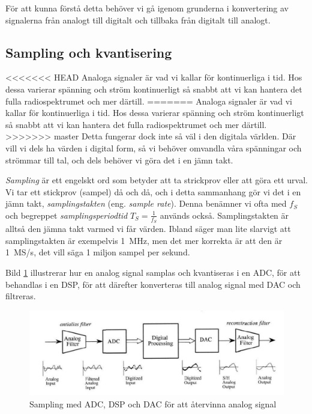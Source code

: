 För att kunna förstå detta behöver vi gå igenom grunderna i konvertering av
signalerna från analogt till digitalt och tillbaka från digitalt till analogt.

\subsection{Sampling och kvantisering}

<<<<<<< HEAD
Analoga signaler är vad vi kallar för kontinuerliga i tid. Hos dessa varierar 
spänning och ström kontinuerligt så snabbt att vi kan hantera det fulla 
radiospektrumet och mer därtill.
=======
Analoga signaler är vad vi kallar för kontinuerliga i tid. Hos dessa varierar spänning och
ström kontinuerligt så snabbt att vi kan hantera det fulla radiospektrumet och mer därtill.
>>>>>>> master
Detta fungerar dock inte så väl i den digitala världen.
Där vill vi dels ha värden i digital form, så vi behöver omvandla våra 
spänningar och strömmar till tal, och dels behöver vi göra det i en jämn takt.

\emph{Sampling} är ett engelskt ord som betyder att ta strickprov eller att 
göra ett urval.
Vi tar ett stickprov (sampel) då och då, och i detta sammanhang gör vi det i en jämn takt,
\emph{samplingstakten} (eng. \emph{sample rate}).
Denna benämner vi ofta med \(f_S\) och begreppet \emph{samplingsperiodtid}
\(T_S=\frac{1}{f_S}\) används också.
Samplingstakten är alltså den jämna takt varmed vi får värden.
Ibland säger man lite slarvigt att samplingstakten är exempelvis 1~MHz, men det
mer korrekta är att den är 1~MS/s, det vill säga 1 miljon sampel per sekund.

Bild \ref{fig:BildII1-37} illustrerar hur en analog signal samplas och
kvantiseras i en ADC, för att behandlas i en DSP, för att därefter konverteras
till analog signal med DAC och filtreras.

\begin{figure}
  \begin{center}
    \includegraphics[width=\textwidth]{images/cropped_pdfs/bild_2_1-37.pdf}
    \caption{Sampling med ADC, DSP och DAC för att återvinna analog signal}
    \label{fig:BildII1-37}
  \end{center}
\end{figure}

